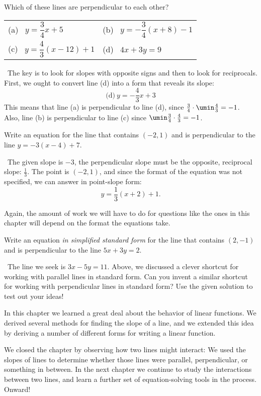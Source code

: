 \begin{boxex}
Which of these lines are perpendicular to each other?

\begin{center}
\begin{tabularx}{0.8\linewidth}{XX}
(a)~ $y=\dfrac{3}{4}x+5$
&
(b)~ $y=-\dfrac{3}{4}(x+8)-1$
\\[3ex]
(c)~ $y=\dfrac{4}{3}(x-12)+1$
&
(d)~ $4x+3y=9$
\end{tabularx}
\end{center}

\exsoln\ The key is to look for slopes with opposite signs and then to look for reciprocals. First, we ought to convert line (d) into a form that reveals its slope: \[\text{(d)}~y=-\frac{4}{3}x + 3\] This means that line (a) is perpendicular to line (d), since $\frac{3}{4}\cdot\umin\frac{4}{3}=-1$. Also, line (b) is perpendicular to line (c) since $\umin\frac{3}{4}\cdot\frac{4}{3}=-1$.
\end{boxex}

\begin{boxex}
Write an equation for the line that contains $(-2,1)$ and is perpendicular to the line $y=-3(x-4) + 7$.

\exsoln\ The given slope is $-3$, the perpendicular slope must be the opposite, reciprocal slope: $\frac{1}{3}$. The point is $(-2,1)$, and since the format of the equation was not specified, we can answer in point-slope form: \[y = \frac{1}{3}(x+2)+1.\]
\end{boxex}

Again, the amount of work we will have to do for questions like the ones in this chapter will depend on the format the equations take.

\begin{boxex}
Write an equation \textit{in simplified standard form} for the line that contains $(2,-1)$ and is perpendicular to the line $5x+3y=2$.

\expsoln\ The line we seek is $3x-5y=11$. Above, we discussed a clever shortcut for working with parallel lines in standard form. Can you invent a similar shortcut for working with perpendicular lines in standard form? Use the given solution to test out your ideas!
%
\end{boxex}

\chaptersummary

In this chapter we learned a great deal about the behavior of linear functions. We derived several methods for finding the slope of a line, and we extended this idea by deriving a number of different forms for writing a linear function.

We closed the chapter by observing how two lines might interact: We used the slopes of lines to determine whether those lines were parallel, perpendicular, or something in between. In the next chapter we continue to study the interactions between two lines, and learn a further set of equation-solving tools in the process. Onward!
